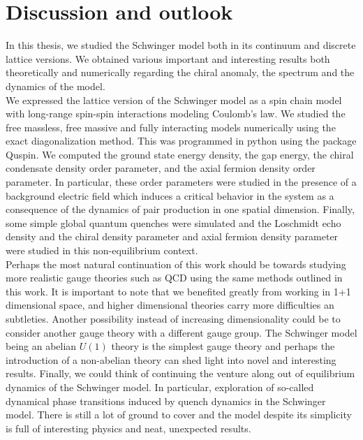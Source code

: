 \chapter{Discussion and outlook}

In this thesis, we studied the Schwinger model both in its continuum and discrete lattice versions. We obtained various important and interesting results both theoretically and numerically regarding the chiral anomaly, the spectrum and the dynamics of the model.\\

We expressed the lattice version of the Schwinger model as a spin chain model with long-range spin-spin interactions modeling Coulomb's law. We studied the free massless, free massive and fully interacting models numerically using the exact diagonalization method. This was programmed in python using the package Quspin. We computed the ground state energy density, the gap energy, the chiral condensate density order parameter, and the axial fermion density order parameter. In particular, these order parameters were studied in the presence of a background electric field which induces a critical behavior in the system as a consequence of the dynamics of pair production in one spatial dimension. Finally, some simple global quantum quenches were simulated and the Loschmidt echo density and the chiral density parameter and axial fermion density parameter were studied in this non-equilibrium context.\\

Perhaps the most natural continuation of this work should be towards studying more realistic gauge theories such as QCD using the same methods outlined in this work. It is important to note that we benefited greatly from working in 1+1 dimensional space, and higher dimensional theories carry more difficulties an subtleties. Another possibility instead of increasing dimensionality could be to consider another gauge theory with a different gauge group. The Schwinger model being an abelian $U(1)$ theory is the simplest gauge theory and perhaps the introduction of a non-abelian theory can shed light into novel and interesting results. Finally, we could think of continuing the venture along out of equilibrium dynamics of the Schwinger model. In particular, exploration of so-called dynamical phase transitions induced by quench dynamics in the Schwinger model. There is still a lot of ground to cover and the model despite its simplicity is full of interesting physics and neat, unexpected results.